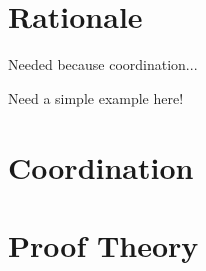 \section{Rationale}

Needed because coordination...

Need a simple example here!

\section{Coordination}
\section{Proof Theory}
